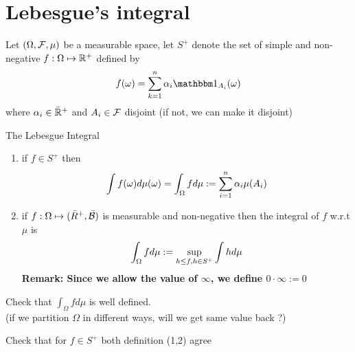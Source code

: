 \newpage
\section{Lebesgue's integral}
Let $(\Omega, \mathcal{F}, \mu)$ be a measurable space, let $S^+$ denote the set of simple and non-negative $f: \Omega \mapsto \mathbb{R}^+$ defined by
\begin{equation*}
    f(\omega) = \bigs{k=1}^n \alpha_i \I_{A_i} (\omega)
\end{equation*}where $\alpha_i \in \bar{\mathbb{R}}^+$ and $A_i \in \mathcal{F}$ disjoint (if not, we can make it disjoint)

\begin{ex}
\end{ex}
\vspace{2cm}
\begin{dfn}{The Lebesgue Integral}
\begin{enumerate}
    \item if $f \in S^+$ then 
    \begin{equation*}
        \int f(\omega) d\mu(\omega) = \int_{\Omega} f d\mu := \sum\limits_{i=1}^n \alpha_i \mu(A_i)
    \end{equation*}
    \item if $f: \Omega \mapsto (\bar{R}^+, \bar{\mathcal{B}})$ is measurable and non-negative then the integral of $f$ w.r.t $\mu$ is 
    \begin{equation*}
        \int_{\Omega} f d\mu := \sup\limits_{h\leq f, h\in S^+} \int h d\mu
    \end{equation*}
    \textbf{Remark: Since we allow the value of $\infty$, we define $0 \cdot \infty :=0$}
\end{enumerate}
\end{dfn}
\begin{ex}
Check that $\int_{\Omega} f d\mu$ is well defined.\\
(if we partition $\Omega$ in different ways, will we get same value back ?) \\
\end{ex}
\begin{ex}
Check that for $f\in S^+$ both definition (1,2) agree
\end{ex}
\newpage
